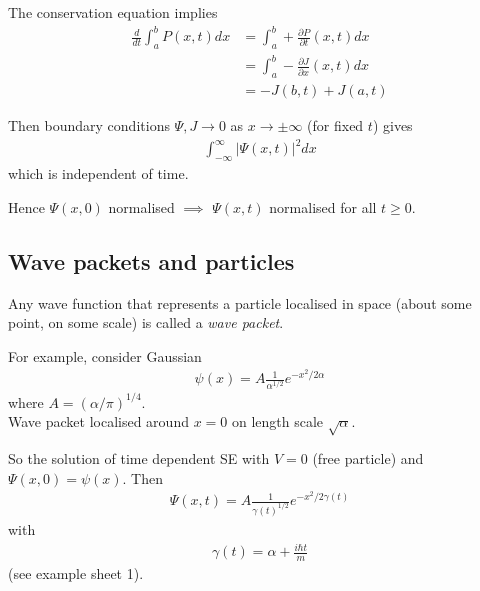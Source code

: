 \documentclass[a4paper]{article}
\begin{document}
The conservation equation implies
\begin{equation*}
\begin{aligned}
\frac{d}{dt}\int_a^b P\left(x,t\right)dx &= \int_a^b + \frac{\partial P}{\partial t}\left(x,t\right)dx\\
&=\int_a^b -\frac{\partial J}{\partial x} \left(x,t\right) dx\\
&= -J\left(b,t\right) + J\left(a,t\right)
\end{aligned}
\end{equation*}

Then boundary conditions $\Psi, J \to 0$ as $x \to \pm \infty$ (for fixed $t$) gives
\begin{equation*}
\begin{aligned}
\int_{-\infty}^\infty \left|\Psi\left(x,t\right)\right|^2 dx
\end{aligned}
\end{equation*}
which is independent of time.

Hence $\Psi\left(x,0\right)$ normalised $\implies$ $\Psi\left(x,t\right)$ normalised for all $t\geq 0$.

\subsection{Wave packets and particles}
Any wave function that represents a particle localised in space (about some point, on some scale) is called a \emph{wave packet}.

For example, consider Gaussian
\begin{equation*}
\begin{aligned}
\psi\left(x\right) = A \frac{1}{\alpha^{1/2}} e^{-x^2/2\alpha}
\end{aligned}
\end{equation*}
where $A = \left(\alpha/\pi\right)^{1/4}$.\\
Wave packet localised around $x=0$ on length scale $\sqrt{\alpha}$.

So the solution of time dependent SE with $V=0$ (free particle) and $\Psi\left(x,0\right) = \psi\left(x\right)$. Then
\begin{equation*}
\begin{aligned}
\Psi\left(x,t\right) = A\frac{1}{\gamma\left(t\right)^{1/2}} e^{-x^2/2\gamma\left(t\right)}
\end{aligned}
\end{equation*}
with
\begin{equation*}
\begin{aligned}
\gamma\left(t\right) = \alpha + \frac{i\hbar t}{m}
\end{aligned}
\end{equation*}
(see example sheet 1).
\end{document}
